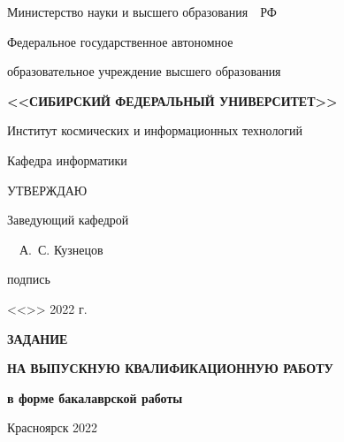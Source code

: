 \begin{spacing}{1}
    \setlength{\parindent}{0cm}

    \centerline{Министерство науки и высшего образования~~РФ}

    \centerline{\small Федеральное государственное автономное}

    \centerline{\small образовательное учреждение высшего образования}

    \centerline{\small\textbf{\MakeUppercase{<<Сибирский Федеральный Университет>>}}}

    \vspace{8pt}

    \centerline{{Институт космических и информационных технологий}}

    \centerline{{Кафедра информатики}}

    \vspace{10pt}

    \hfill\begin{minipage}{5.5cm}
        УТВЕРЖДАЮ

        Заведующий кафедрой

        \uline{\hfill}~~А.~С. Кузнецов

        \vspace{-4pt}
        {\footnotesize \hspace{2.5ex} подпись}

        <<\uline{\hspace{3ex}}>> \uline{\hspace{9ex}} 2022 г.
    \end{minipage}

    \vfill

    \centerline{\bf ЗАДАНИЕ}
    \centerline{\bf НА ВЫПУСКНУЮ КВАЛИФИКАЦИОННУЮ РАБОТУ}
    \centerline{\bf в форме бакалаврской работы}

    \vfill
    \vfill
    \vfill

    \centerline{Красноярск 2022}

\end{spacing}

\thispagestyle{empty}

\clearpage
